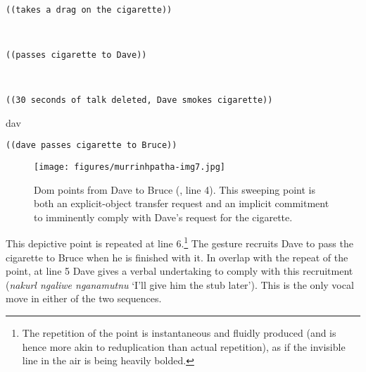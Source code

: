 \documentclass[output=paper,nonflat,colorlinks,citecolor=brown]{langsci/langscibook}
\begin{document}
\begin{transbox}{7}{~}
\begin{verbatim}
((takes a drag on the cigarette))
\end{verbatim}
\end{transbox}
%
\begin{mdframednoverticalspace}[style=secondfoc]
\begin{transbox}{8}{~}
\begin{verbatim}
((passes cigarette to Dave))
\end{verbatim}
\end{transbox}
\end{mdframednoverticalspace}
%
\begin{transbox}{9}{~}
\begin{verbatim}
((30 seconds of talk deleted, Dave smokes cigarette))
\end{verbatim}
\end{transbox}
%
\begin{mdframednoverticalspace}[style=secondfoc]
\begin{transbox}{10}{dav}
\begin{verbatim}
((dave passes cigarette to Bruce))
\end{verbatim}
\end{transbox}
\end{mdframednoverticalspace}

\begin{figure}
\texttt{[image: figures/murrinhpatha-img7.jpg]}
\caption{
Dom points from Dave to Bruce (, line 4). This sweeping point is both an explicit-object transfer request and an implicit commitment to imminently comply with Dave’s request for the cigarette.
\label{fig:blythe:7}
}\end{figure}

This depictive point is repeated at line 6.\footnote{The repetition of the point is instantaneous and fluidly produced (and is hence more akin to reduplication than actual repetition), as if the invisible line in the air is being heavily bolded.} The gesture recruits Dave to pass the cigarette to Bruce when he is finished with it. In overlap with the repeat of the point, at line 5 Dave gives a verbal undertaking to comply with this recruitment (\textit{nakurl ngaliwe nganamutnu} ‘I’ll give him the stub later’). %
This is the only vocal move in either of the two sequences.
\end{document}
